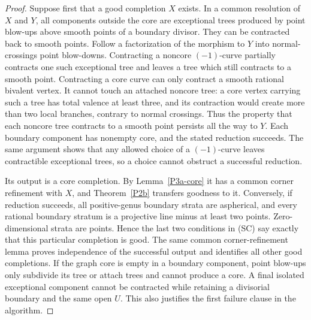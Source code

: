 \begin{proof}
Suppose first that a good completion $X$ exists.  In a common resolution of
$X$ and $Y$, all components outside the core are exceptional trees produced
by point blow-ups above smooth points of a boundary divisor.  They can be
contracted back to smooth points.  Follow a factorization of the morphism to
$Y$ into normal-crossings point blow-downs.  Contracting a noncore $(-1)$-curve
partially contracts one such exceptional tree and leaves a tree which still
contracts to a smooth point.  Contracting a core curve can only contract a
smooth rational bivalent vertex.  It cannot touch an attached noncore tree:
a core vertex carrying such a tree has total valence at least three, and its
contraction would create more than two local branches, contrary to normal
crossings.  Thus the property that each noncore tree contracts to a smooth
point persists all the way to $Y$.  Each boundary component has nonempty core,
and the stated reduction succeeds.  The same argument shows that any allowed
choice of a $(-1)$-curve leaves contractible exceptional trees, so a choice
cannot obstruct a successful reduction.

Its output is a core completion.  By Lemma~\ref{P3a-core} it has a common corner
refinement with $X$, and Theorem~\ref{P2b} transfers goodness to it.  Conversely,
if reduction succeeds, all positive-genus boundary strata are aspherical,
and every rational boundary stratum is a projective line minus at least two
points.  Zero-dimensional strata are points.  Hence the last two conditions
in (SC) say exactly that this particular completion is good.  The same common
corner-refinement lemma proves independence of the successful output and
identifies all other good completions.  If the graph core is empty in a boundary
component, point blow-ups only subdivide its tree or attach trees and cannot
produce a core.  A final isolated exceptional component cannot be contracted
while retaining a divisorial boundary and the same open $U$.  This also
justifies the first failure clause in the algorithm.
\end{proof}

